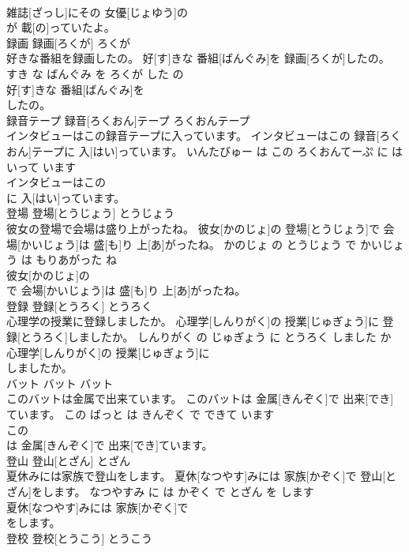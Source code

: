 \documentclass[8pt]{extreport}
\begin{document}
\begin{CJK}{UTF8}{min}
\\	雑誌[ざっし]にその 女優[じょゆう]の
\\	が 載[の]っていたよ。			
\\	録画	録画[ろくが]	ろくが	
\\	好きな番組を録画したの。	好[す]きな 番組[ばんぐみ]を 録画[ろくが]したの。	すき な ばんぐみ を ろくが した の	
\\	好[す]きな 番組[ばんぐみ]を
\\	したの。			
\\	録音テープ	録音[ろくおん]テープ	ろくおんテープ	
\\	インタビューはこの録音テープに入っています。	インタビューはこの 録音[ろくおん]テープに 入[はい]っています。	いんたびゅー は この ろくおんてーぷ に はいって います	
\\	インタビューはこの
\\	に 入[はい]っています。			
\\	登場	登場[とうじょう]	とうじょう	
\\	彼女の登場で会場は盛り上がったね。	彼女[かのじょ]の 登場[とうじょう]で 会場[かいじょう]は 盛[も]り 上[あ]がったね。	かのじょ の とうじょう で かいじょう は もりあがった ね	
\\	彼女[かのじょ]の
\\	で 会場[かいじょう]は 盛[も]り 上[あ]がったね。			
\\	登録	登録[とうろく]	とうろく	
\\	心理学の授業に登録しましたか。	心理学[しんりがく]の 授業[じゅぎょう]に 登録[とうろく]しましたか。	しんりがく の じゅぎょう に とうろく しました か	
\\	心理学[しんりがく]の 授業[じゅぎょう]に
\\	しましたか。			
\\	バット	バット	バット	
\\	このバットは金属で出来ています。	このバットは 金属[きんぞく]で 出来[でき]ています。	この ばっと は きんぞく で できて います	
\\	この
\\	は 金属[きんぞく]で 出来[でき]ています。			
\\	登山	登山[とざん]	とざん	
\\	夏休みには家族で登山をします。	夏休[なつやす]みには 家族[かぞく]で 登山[とざん]をします。	なつやすみ に は かぞく で とざん を します	
\\	夏休[なつやす]みには 家族[かぞく]で
\\	をします。			
\\	登校	登校[とうこう]	とうこう	

\end{CJK}
\end{document}
